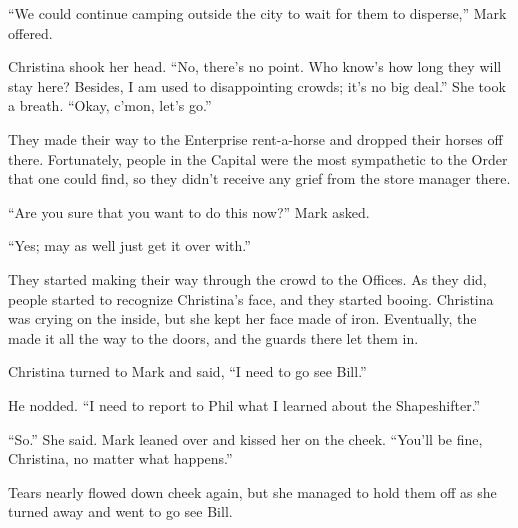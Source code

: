 \documentclass[showtrims,b6paper,draft,10pt]{memoir}
\begin{document}
``We could continue camping outside the city to wait for them to disperse,'' Mark offered.

Christina shook her head.  ``No, there's no point.  Who know's how long they will stay here?  Besides, I am used to disappointing crowds;  it's no big deal.''  She took a breath.  ``Okay, c'mon, let's go.''

They made their way to the Enterprise rent-a-horse and dropped their horses off there.  Fortunately, people in the Capital were the most sympathetic to the Order that one could find, so they didn't receive any grief from the store manager there.

``Are you sure that you want to do this now?''  Mark asked.

``Yes;  may as well just get it over with.''

They started making their way through the crowd to the Offices.  As they did, people started to recognize Christina's face, and they started booing.  Christina was crying on the inside, but she kept her face made of iron.  Eventually, the made it all the way to the doors, and the guards there let them in.

Christina turned to Mark and said, ``I need to go see Bill.''

He nodded.  ``I need to report to Phil what I learned about the Shapeshifter.''

``So.''  She said.  Mark leaned over and kissed her on the cheek.  ``You'll be fine, Christina, no matter what happens.''

Tears nearly flowed down cheek again, but she managed to hold them off as she turned away and went to go see Bill.

\timeskip

\appendix{}
\end{document}
